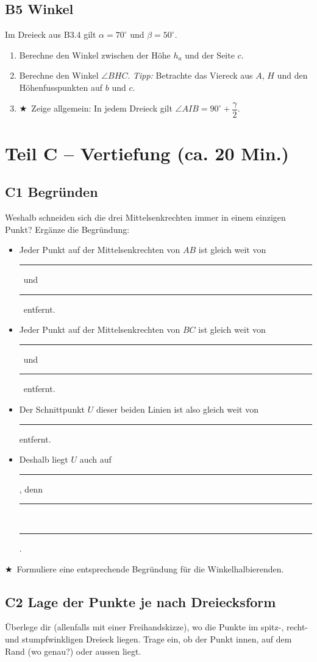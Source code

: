 \documentclass[11pt,a4paper]{article}
\newcommand{\stern}{$\bigstar$\ }
\newcommand{\luecke}{\rule{1.8cm}{0.4pt}}
\begin{document}
\subsection{B5 \quad Winkel}
Im Dreieck aus B3.4 gilt $\alpha = 70^\circ$ und $\beta = 50^\circ$.
\begin{enumerate}
\item Berechne den Winkel zwischen der H\"ohe $h_a$ und der Seite $c$.
\item Berechne den Winkel $\angle BHC$. \emph{Tipp:} Betrachte das Viereck aus $A$, $H$ und den H\"ohenfusspunkten auf $b$ und $c$.
\item \stern Zeige allgemein: In jedem Dreieck gilt $\angle AIB = 90^\circ + \dfrac{\gamma}{2}$.
\end{enumerate}

\section{Teil C -- Vertiefung (ca. 20 Min.)}

\subsection{C1 \quad Begr\"unden}
Weshalb schneiden sich die drei Mittelsenkrechten immer in einem einzigen Punkt? Erg\"anze die Begr\"undung:

\begin{itemize}[itemsep=10pt]
\item Jeder Punkt auf der Mittelsenkrechten von $AB$ ist gleich weit von \luecke\ und \luecke\ entfernt.
\item Jeder Punkt auf der Mittelsenkrechten von $BC$ ist gleich weit von \luecke\ und \luecke\ entfernt.
\item Der Schnittpunkt $U$ dieser beiden Linien ist also gleich weit von \rule{4.5cm}{0.4pt} entfernt.
\item Deshalb liegt $U$ auch auf \rule{4.5cm}{0.4pt}, denn \rule{6cm}{0.4pt}\\[10pt] \rule{0.96\linewidth}{0.4pt}.
\end{itemize}

\stern Formuliere eine entsprechende Begr\"undung f\"ur die Winkelhalbierenden.

\needspace{9cm}
\subsection{C2 \quad Lage der Punkte je nach Dreiecksform}
\"Uberlege dir (allenfalls mit einer Freihandskizze), wo die Punkte im spitz-, recht- und stumpfwinkligen Dreieck liegen. Trage ein, ob der Punkt innen, auf dem Rand (wo genau?) oder aussen liegt.
\end{document}
